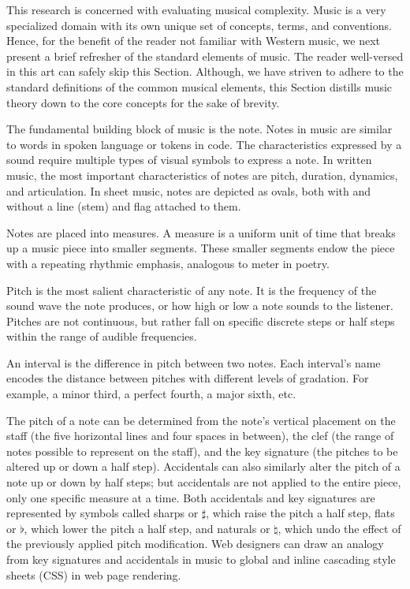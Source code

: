 \documentclass[12pt]{report}
\begin{document}
This research is concerned with evaluating musical complexity. Music is a very specialized domain with its own unique set of concepts, terms, and conventions. Hence, for the benefit of the reader not familiar with Western music, we next present a brief refresher of the standard elements of music. The reader well-versed in this art can safely skip this Section. Although, we have striven to adhere to the standard definitions of the common musical elements, this Section distills music theory down to the core concepts for the sake of brevity.

The fundamental building block of music is the note. Notes in music are similar to words in spoken language or tokens in code. The characteristics expressed by a sound require multiple types of visual symbols to express a note. In written music, the most important characteristics of notes are pitch, duration, dynamics, and articulation. In sheet music, notes are depicted as ovals, both with and without a line (stem) and flag attached to them.

Notes are placed into measures. A measure is a uniform unit of time that breaks up a music piece into smaller segments. These smaller segments endow the piece with a repeating rhythmic emphasis, analogous to meter in poetry.

Pitch is the most salient characteristic of any note. It is the frequency of the sound wave the note produces, or how high or low a note sounds to the listener. Pitches are not continuous, but rather fall on specific discrete steps or half steps within the range of audible frequencies. 

An interval is the difference in pitch between two notes. Each interval's name encodes the distance between pitches with different levels of gradation. For example, a minor third, a perfect fourth, a major sixth, etc.

The pitch of a note can be determined from the note's vertical placement on the staff (the five horizontal lines and four spaces in between), the clef (the range of notes possible to represent on the staff), and the key signature (the pitches to be altered up or down a half step). Accidentals can also similarly alter the pitch of a note up or down by half steps; but accidentals are not applied to the entire piece, only one specific measure at a time. Both accidentals and key signatures are represented by symbols called sharps or $\sharp$, which raise the pitch a half step, flats or $\flat$, which lower the pitch a half step, and naturals or $\natural$, which undo the effect of the previously applied pitch modification. Web designers can draw an analogy from key signatures and accidentals in music to global and inline cascading style sheets (CSS) in web page rendering.
\end{document}
